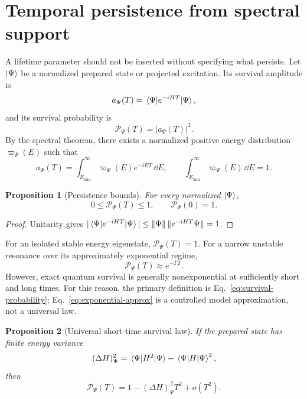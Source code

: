 \documentclass[11pt]{article}
\newtheorem{proposition}{Proposition}
\theoremstyle{remark}
\newcommand{\Persist}{\mathcal P}
\begin{document}
\section{Temporal persistence from spectral support}

A lifetime parameter should not be inserted without specifying what persists. Let $\ket{\Psi}$ be a normalized prepared state or projected excitation. Its survival amplitude is
\begin{equation}
  a_\Psi(T)
  =\mel{\Psi}{e^{-iHT}}{\Psi},
  \label{eq:survival-amplitude}
\end{equation}
and its survival probability is
\begin{equation}
  \Persist_\Psi(T)=|a_\Psi(T)|^2.
  \label{eq:survival-probability}
\end{equation}
By the spectral theorem, there exists a normalized positive energy distribution $\varpi_\Psi(E)$ such that
\begin{equation}
  a_\Psi(T)
  =\int_{E_{\min}}^\infty
  \varpi_\Psi(E)e^{-iET}\,\dd E,
  \qquad
  \int_{E_{\min}}^\infty\varpi_\Psi(E)\,\dd E=1.
  \label{eq:fock-krylov}
\end{equation}

\begin{proposition}[Persistence bounds]
For every normalized $\ket{\Psi}$,
\begin{equation}
  0\le\Persist_\Psi(T)\le1,
  \qquad
  \Persist_\Psi(0)=1.
\end{equation}
\end{proposition}

\begin{proof}
Unitarity gives
$|\mel{\Psi}{e^{-iHT}}{\Psi}|\le
\|\Psi\|\,\|e^{-iHT}\Psi\|=1$.
\end{proof}

For an isolated stable energy eigenstate, $\Persist_\Psi(T)=1$. For a narrow unstable resonance over its approximately exponential regime,
\begin{equation}
  \Persist_\Psi(T)\approx e^{-\Gamma T}.
  \label{eq:exponential-approx}
\end{equation}
However, exact quantum survival is generally nonexponential at sufficiently short and long times. For this reason, the primary definition is Eq.~\eqref{eq:survival-probability}; Eq.~\eqref{eq:exponential-approx} is a controlled model approximation, not a universal law.


\begin{proposition}[Universal short-time survival law]
If the prepared state has finite energy variance
\begin{equation}
 (\Delta H)^2_\Psi
 =\mel{\Psi}{H^2}{\Psi}-\mel{\Psi}{H}{\Psi}^2,
\end{equation}
then
\begin{equation}
 \Persist_\Psi(T)
 =1-(\Delta H)^2_\Psi T^2+o(T^2).
 \label{eq:zeno-survival}
\end{equation}
\end{proposition}
\end{document}
